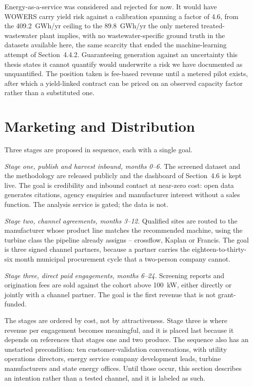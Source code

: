 \documentclass[12pt,letterpaper]{report}
\begin{document}
Energy-as-a-service was considered and rejected for now. It would have WOWERS carry
yield risk against a calibration spanning a factor of 4.6, from the 409.2~GWh/yr
ceiling to the 89.8~GWh/yr the only metered treated-wastewater plant implies, with no
wastewater-specific ground truth in the datasets available here, the same scarcity
that ended the machine-learning attempt of Section~4.4.2. Guaranteeing generation
against an uncertainty this thesis states it cannot quantify would underwrite a risk we
have documented as unquantified. The position taken is fee-based revenue until a
metered pilot exists, after which a yield-linked contract can be priced on an
observed capacity factor rather than a substituted one.

\section{Marketing and Distribution}

Three stages are proposed in sequence, each with a single goal.

\emph{Stage one, publish and harvest inbound, months 0--6.} The screened dataset
and the methodology are released publicly and the dashboard of Section~4.6 is kept
live. The goal is credibility and inbound contact at near-zero cost: open data
generates citations, agency enquiries and manufacturer interest without a sales
function. The analysis service is gated; the data is not.

\emph{Stage two, channel agreements, months 3--12.} Qualified sites are routed to
the manufacturer whose product line matches the recommended machine, using the
turbine class the pipeline already assigns -- crossflow, Kaplan or Francis. The goal
is three signed channel partners, because a partner carries the eighteen-to-thirty-six
month municipal procurement cycle that a two-person company cannot.

\emph{Stage three, direct paid engagements, months 6--24.} Screening reports and
origination fees are sold against the cohort above 100~kW, either directly or jointly
with a channel partner. The goal is the first revenue that is not grant-funded.

The stages are ordered by cost, not by attractiveness. Stage three is where revenue
per engagement becomes meaningful, and it is placed last because it depends on
references that stages one and two produce. The sequence also has an unstarted
precondition: ten customer-validation conversations, with utility operations
directors, energy service company development leads, turbine manufacturers and state
energy offices. Until those occur, this section describes an intention rather than a
tested channel, and it is labeled as such.
\end{document}
